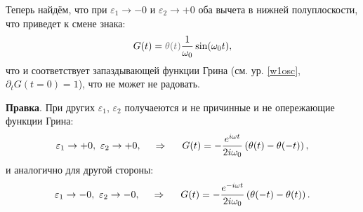 Теперь найдём, что при $\varepsilon_1 \to -0$ и $\varepsilon_2 \to + 0$ оба вычета в нижней полуплоскости, что приведет к смене знака:
\begin{equation*}
    G(t) = \textcolor{grey}{\theta (t)} \frac{1}{\omega_0} \sin(\omega_0 t),
\end{equation*}
что и соответствует запаздывающей функции Грина (см. ур. \eqref{w1osc}, $\partial_t G(t=0) = 1$), что не может не радовать. 



\textbf{Правка}. При других $\varepsilon_1,\, \varepsilon_2$ получаеются и не причинные и не опережающие функции Грина:
\begin{equation*}
    \varepsilon_1 \to + 0, \ \varepsilon_2 \to + 0,
    \hspace{0.5cm} \Rightarrow \hspace{0.5cm}
    G(t) = - \frac{e^{i \omega t}}{2 i \omega_0} \left(\theta(t) - \theta(-t)\right),
\end{equation*}
и аналогично для другой стороны:
\begin{equation*}
    \varepsilon_1 \to - 0, \ \varepsilon_2 \to - 0,
    \hspace{0.5cm} \Rightarrow \hspace{0.5cm}
    G(t) = - \frac{e^{-i \omega t}}{2 i \omega_0} \left(\theta(-t) - \theta(t)\right).
\end{equation*}